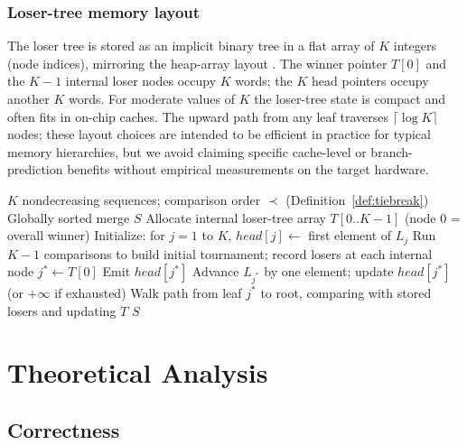 \documentclass[12pt,a4paper]{article}
\theoremstyle{plain}
\theoremstyle{definition}
\begin{document}
\subsubsection{Loser-tree memory layout}
The loser tree is stored as an implicit binary tree in a flat array of $K$
integers (node indices), mirroring the heap-array layout \cite{Knuth1998}.
The winner pointer $T[0]$ and the $K-1$ internal loser nodes occupy
$K$ words; the $K$ head pointers occupy another $K$ words.  For moderate
values of $K$ the loser-tree state is compact and often fits in on-chip
caches.  The upward path from any leaf traverses $\lceil\log K\rceil$
nodes; these layout choices are intended to be efficient in practice
for typical memory hierarchies, but we avoid claiming specific cache-level or branch-prediction benefits
without empirical measurements on the target hardware.
\begin{algorithm}[H]
\caption{\textsc{KWayLoserTree}$(L_1, \dots, L_K)$}
\label{alg:loser}
\begin{algorithmic}[1]
\Require $K$ nondecreasing sequences; comparison order $\prec$ (Definition~\ref{def:tiebreak})
\Ensure Globally sorted merge $S$
\State Allocate internal loser-tree array $T[0..K-1]$ (node 0 = overall winner)
\State Initialize: for $j = 1$ to $K$, $\mathit{head}[j] \gets$ first element of $L_j$
\State Run $K-1$ comparisons to build initial tournament; record losers at each internal node
    \State $j^* \gets T[0]$ 
    \State Emit $\mathit{head}[j^*]$
    \State Advance $L_{j^*}$ by one element; update $\mathit{head}[j^*]$ (or $+\infty$ if exhausted)
    \State Walk path from leaf $j^*$ to root, comparing with stored losers and updating $T$
\EndWhile
\State \Return $S$
\end{algorithmic}
\end{algorithm}

\section{Theoretical Analysis}
\label{sec:theory}

\subsection{Correctness}
\label{sec:correctness}
\end{document}
